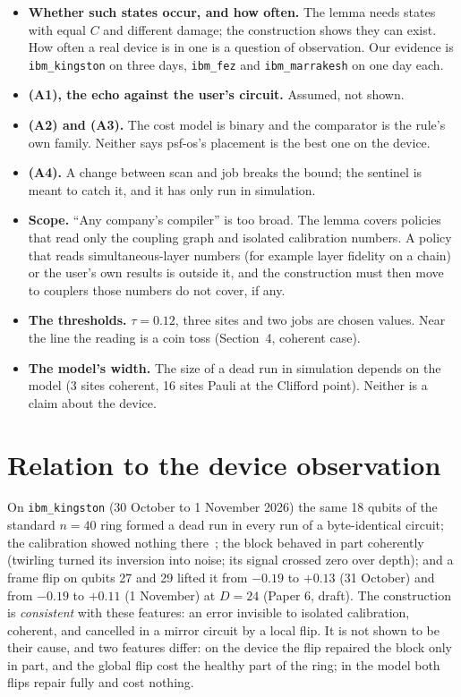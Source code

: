 \documentclass[10pt,a4paper]{article}
\theoremstyle{definition}
\theoremstyle{remark}
\begin{document}
\begin{itemize}
\item \textbf{Whether such states occur, and how often.} The lemma needs states with equal $C$ and different damage;
  the construction shows they can exist. How often a real device is in one is a question of observation. Our evidence
  is \texttt{ibm\_kingston} on three days, \texttt{ibm\_fez} and \texttt{ibm\_marrakesh} on one day each.
\item \textbf{(A1), the echo against the user's circuit.} Assumed, not shown.
\item \textbf{(A2) and (A3).} The cost model is binary and the comparator is the rule's own family. Neither says
  psf-os's placement is the best one on the device.
\item \textbf{(A4).} A change between scan and job breaks the bound; the sentinel is meant to catch it, and it has
  only run in simulation.
\item \textbf{Scope.} ``Any company's compiler'' is too broad. The lemma covers policies that read only the coupling
  graph and isolated calibration numbers. A policy that reads simultaneous-layer numbers (for example layer fidelity on
  a chain) or the user's own results is outside it, and the construction must then move to couplers those numbers do
  not cover, if any.
\item \textbf{The thresholds.} $\tau=0.12$, three sites and two jobs are chosen values. Near the line the reading is a
  coin toss (Section~4, coherent case).
\item \textbf{The model's width.} The size of a dead run in simulation depends on the model (3 sites coherent, 16
  sites Pauli at the Clifford point). Neither is a claim about the device.
\end{itemize}

\section{Relation to the device observation}

On \texttt{ibm\_kingston} (30 October to 1 November 2026) the same 18 qubits of the standard $n=40$ ring formed a dead
run in every run of a byte-identical circuit; the calibration showed nothing there~\cite{paper5}; the block behaved in
part coherently (twirling turned its inversion into noise; its signal crossed zero over depth); and a frame flip on
qubits 27 and 29 lifted it from $-0.19$ to $+0.13$ (31 October) and from $-0.19$ to $+0.11$ (1 November) at $D=24$ (Paper 6, draft). The construction is
\emph{consistent} with these features: an error invisible to isolated calibration, coherent, and cancelled in a mirror
circuit by a local flip. It is not shown to be their cause, and two features differ: on the device the flip repaired
the block only in part, and the global flip cost the healthy part of the ring; in the model both flips repair fully
and cost nothing.
\end{document}
